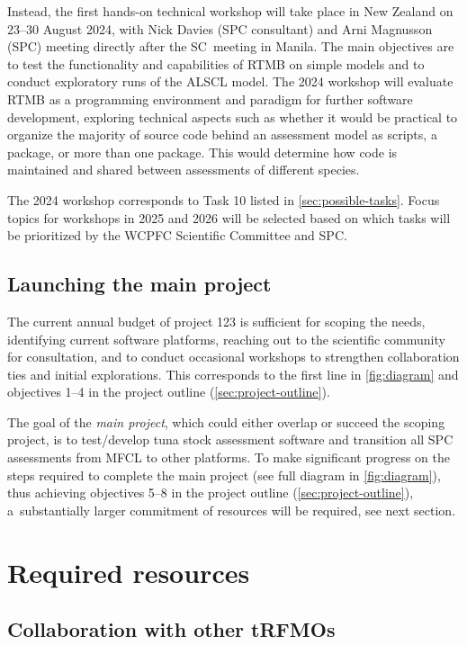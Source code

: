 \documentclass{SCreport}
\begin{document}
Instead, the first hands-on technical workshop will take place in New Zealand on
23--30 August 2024, with Nick Davies (SPC consultant) and Arni Magnusson (SPC)
meeting directly after the SC~meeting in Manila. The main objectives are to test
the functionality and capabilities of RTMB on simple models and to conduct
exploratory runs of the ALSCL model. The 2024 workshop will evaluate RTMB as a
programming environment and paradigm for further software development, exploring
technical aspects such as whether it would be practical to organize the majority
of source code behind an assessment model as scripts, a package, or more than
one package. This would determine how code is maintained and shared between
assessments of different species.

The 2024 workshop corresponds to Task 10 listed in \autoref{sec:possible-tasks}.
Focus topics for workshops in 2025 and 2026 will be selected based on which
tasks will be prioritized by the WCPFC Scientific Committee and SPC.

\subsection{Launching the main project}

The current annual budget of project 123 is sufficient for scoping the needs,
identifying current software platforms, reaching out to the scientific community
for consultation, and to conduct occasional workshops to strengthen
collaboration ties and initial explorations. This corresponds to the first line
in \autoref{fig:diagram} and objectives 1--4 in the project outline
(\autoref{sec:project-outline}).

The goal of the \emph{main project}, which could either overlap or succeed the
scoping project, is to test/develop tuna stock assessment software and
transition all SPC assessments from MFCL to other platforms. To make significant
progress on the steps required to complete the main project (see full diagram in
\autoref{fig:diagram}), thus achieving objectives 5--8 in the project outline
(\autoref{sec:project-outline}), a~substantially larger commitment of resources
will be required, see next section.

\section{Required resources}

\subsection{Collaboration with other tRFMOs}
\end{document}
